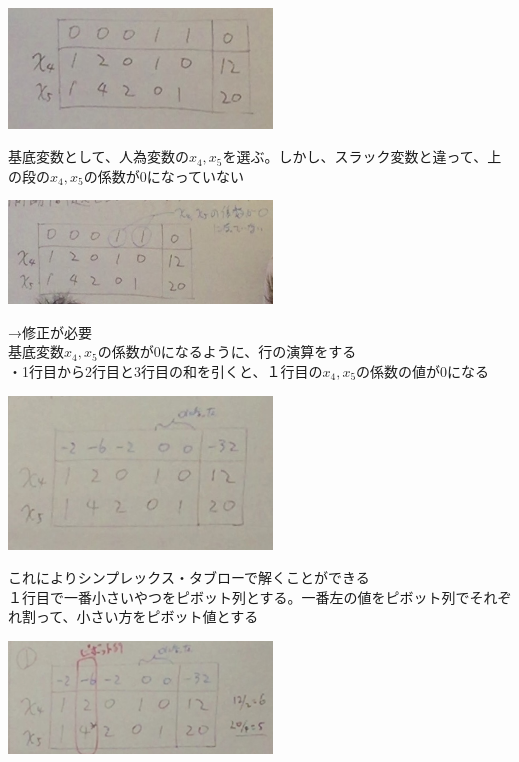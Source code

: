 \documentclass{jsarticle}
\begin{document}
{{{	\begin{center}
		\includegraphics[width=7cm]{1_7_4.JPG}
	\end{center}
	基底変数として、人為変数の$x_4,x_5$を選ぶ。しかし、スラック変数と違って、上の段の$x_4,x_5$の係数が0になっていない\\
	\begin{center}
		\includegraphics[width=7cm]{1_7_5.JPG}
	\end{center}
	→修正が必要\\
	基底変数$x_4,x_5$の係数が0になるように、行の演算をする\\
	・1行目から2行目と3行目の和を引くと、１行目の$x_4,x_5$の係数の値が0になる
	\begin{center}
		\includegraphics[width=7cm]{1_7_6.JPG}
	\end{center}
	これによりシンプレックス・タブローで解くことができる\\
	１行目で一番小さいやつをピボット列とする。一番左の値をピボット列でそれぞれ割って、小さい方をピボット値とする\\
	\begin{center}
		\includegraphics[width=7cm]{1_7_7.JPG}

\end{center}}}}
\end{document}
